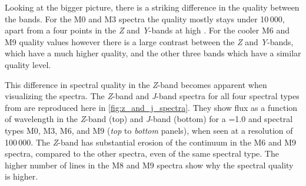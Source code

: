Looking at the bigger picture, there is a striking difference in the quality between the bands.
For the {M0} and {M3} spectra the quality mostly stays under 10\,000, apart from a four points in the \emph{Z} and \emph{Y}-bands at high \feh{}.
For the cooler {M6} and {M9} quality values however there is a large contrast between the \emph{Z} and \emph{Y}-bands, which have a much higher quality, and the other three bands which have a similar quality level.

This difference in spectral quality in the \emph{Z}-band becomes apparent when visualizing the spectra.
The \emph{Z}-band and \emph{J}-band spectra for all four spectral types from \citet{figueira_radial_2016} are reproduced here in \cref{fig:z_and_j_spectra}.
They show flux as a function of wavelength in the \emph{Z}-band (top) and \emph{J}-band (bottom) for a \Vsini{}=1.0\kmps{} and spectral types {M0}, {M3}, {M6}, and {M9} (\textit{top} to \textit{bottom} panels), when seen at a resolution of 100\,000.
The \emph{Z}-band has substantial erosion of the continuum in the {M6} and {M9} spectra, compared to the other spectra, even of the same spectral type.
The higher number of lines in the M8 and {M9} spectra show why the spectral quality is higher.

